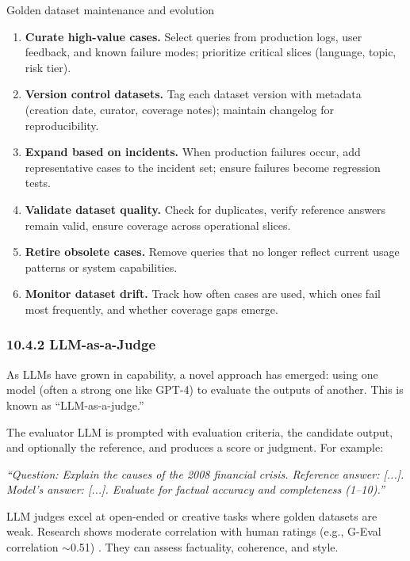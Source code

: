 \begin{llmalgobox}{Golden dataset maintenance and evolution}
\label{alg:ch10_golden_dataset_maintenance}
\begin{enumerate}[leftmargin=1.6em, itemsep=3pt]
    \item \textbf{Curate high-value cases.} Select queries from production logs, user feedback, and known failure modes; prioritize critical slices (language, topic, risk tier).
    \item \textbf{Version control datasets.} Tag each dataset version with metadata (creation date, curator, coverage notes); maintain changelog for reproducibility.
    \item \textbf{Expand based on incidents.} When production failures occur, add representative cases to the incident set; ensure failures become regression tests.
    \item \textbf{Validate dataset quality.} Check for duplicates, verify reference answers remain valid, ensure coverage across operational slices.
    \item \textbf{Retire obsolete cases.} Remove queries that no longer reflect current usage patterns or system capabilities.
    \item \textbf{Monitor dataset drift.} Track how often cases are used, which ones fail most frequently, and whether coverage gaps emerge.
\end{enumerate}
\end{llmalgobox}  

\subsubsection*{10.4.2 LLM-as-a-Judge}
As LLMs have grown in capability, a novel approach has emerged: using one model (often a strong one like GPT-4) to evaluate the outputs of another. This is known as “LLM-as-a-judge.”  

The evaluator LLM is prompted with evaluation criteria, the candidate output, and optionally the reference, and produces a score or judgment. For example:  

\emph{“Question: Explain the causes of the 2008 financial crisis. Reference answer: [...]. Model’s answer: [...]. Evaluate for factual accuracy and completeness (1–10).”}  

LLM judges excel at open-ended or creative tasks where golden datasets are weak. Research shows moderate correlation with human ratings (e.g., G-Eval correlation $\sim$0.51) \cite{liu2023geval}. They can assess factuality, coherence, and style.  

